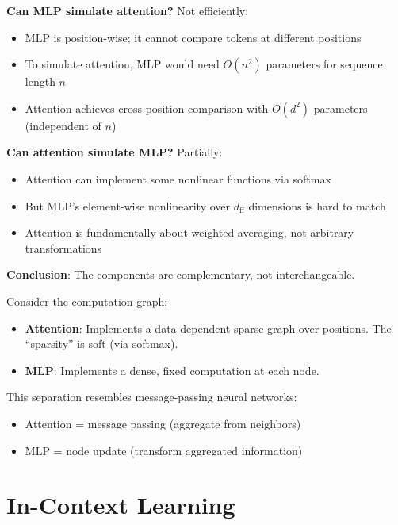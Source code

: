 \begin{remark}
    \textbf{Can MLP simulate attention?} Not efficiently:
    \begin{itemize}
        \item MLP is position-wise; it cannot compare tokens at different positions
        \item To simulate attention, MLP would need $O(n^2)$ parameters for sequence length $n$
        \item Attention achieves cross-position comparison with $O(d^2)$ parameters (independent of $n$)
    \end{itemize}

    \textbf{Can attention simulate MLP?} Partially:
    \begin{itemize}
        \item Attention can implement some nonlinear functions via softmax
        \item But MLP's element-wise nonlinearity over $d_{\text{ff}}$ dimensions is hard to match
        \item Attention is fundamentally about weighted averaging, not arbitrary transformations
    \end{itemize}

    \textbf{Conclusion}: The components are complementary, not interchangeable.
\end{remark}

\begin{remark}
    Consider the computation graph:
    \begin{itemize}
        \item \textbf{Attention}: Implements a data-dependent sparse graph over positions. The ``sparsity'' is soft (via softmax).
        \item \textbf{MLP}: Implements a dense, fixed computation at each node.
    \end{itemize}

    This separation resembles message-passing neural networks:
    \begin{itemize}
        \item Attention = message passing (aggregate from neighbors)
        \item MLP = node update (transform aggregated information)
    \end{itemize}
\end{remark}

\section{In-Context Learning}

